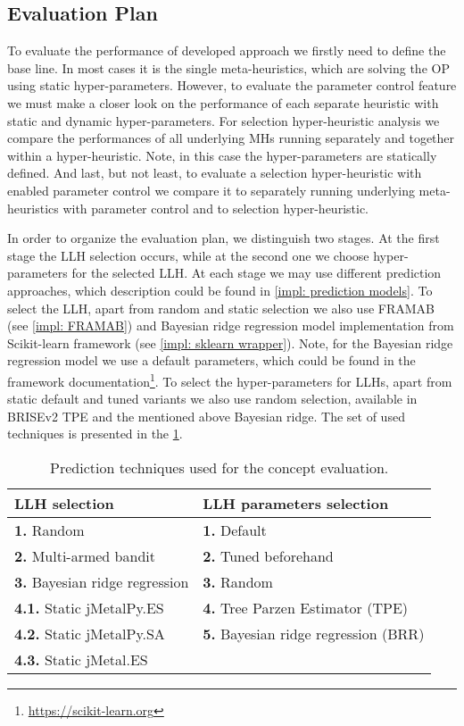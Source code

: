 \subsection{Evaluation Plan}\label{eval:1:plan}
To evaluate the performance of developed approach we firstly need to define the base line. In most cases it is the single meta-heuristics, which are solving the OP using static hyper-parameters. However, to evaluate the parameter control feature we must make a closer look on the performance of each separate heuristic with static and dynamic hyper-parameters. For selection hyper-heuristic analysis we compare the performances of all underlying MHs running separately and together within a hyper-heuristic. Note, in this case the hyper-parameters are statically defined. And last, but not least, to evaluate a selection hyper-heuristic with enabled parameter control we compare it to separately running underlying meta-heuristics with parameter control and to selection hyper-heuristic.

In order to organize the evaluation plan, we distinguish two stages.
At the first stage the LLH selection occurs, while at the second one we choose hyper-parameters for the selected LLH. At each stage we may use different prediction approaches, which description could be found in \cref{impl: prediction models}. To select the LLH, apart from random and static selection we also use FRAMAB (see \cref{impl: FRAMAB}) and Bayesian ridge regression model implementation from Scikit-learn framework (see \cref{impl: sklearn wrapper}). Note, for the Bayesian ridge regression model we use a default parameters, which could be found in the framework documentation\footnote{\href{https://scikit-learn.org/stable/modules/generated/sklearn.linear_model.BayesianRidge.html}{https://scikit-learn.org}}. To select the hyper-parameters for LLHs, apart from static default and tuned variants we also use random selection, available in BRISEv2 TPE and the mentioned above Bayesian ridge. The set of used techniques is presented in the \cref{eval: concept settings table}.
\begin{table}[h!]
	\centering
	\begin{tabular}{l||l}
		\textbf{LLH selection} & \textbf{LLH parameters selection} \\
		\hline
		\hline
		\textbf{1.} Random & \textbf{1.} Default \\
		\textbf{2.} Multi-armed bandit & \textbf{2.} Tuned beforehand \\
		\textbf{3.} Bayesian ridge regression & \textbf{3.} Random \\
		\textbf{4.1.} Static jMetalPy.ES & \textbf{4.} Tree Parzen Estimator (TPE) \\
		\textbf{4.2.} Static jMetalPy.SA & \textbf{5.} Bayesian ridge regression (BRR) \\
		\textbf{4.3.} Static jMetal.ES & 
	\end{tabular}
	
	\caption{Prediction techniques used for the concept evaluation.}
	\label{eval: concept settings table}
\end{table}


